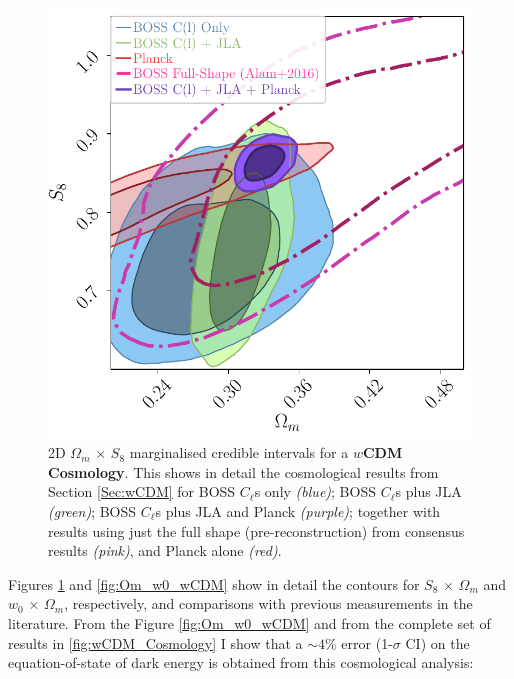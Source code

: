 \begin{figure}
\begin{center}
\includegraphics[scale=0.70]{BOSS-FIGS/Om_S8_wCDM.pdf}
\caption[2D $\Omega_m \, \times \, S_8$ marginalised credible intervals for a $w$CDM Cosmology.]{2D $\Omega_m \, \times \, S_8$ marginalised credible intervals for a \textbf{$w$CDM Cosmology}. This shows in detail the cosmological results from Section \ref{Sec:wCDM} for BOSS $C_{\ell}$s only \textit{(blue)}; BOSS $C_{\ell}$s plus JLA \textit{(green)}; BOSS $C_{\ell}$s plus JLA and Planck \textit{(purple)}; together with results using just the full shape (pre-reconstruction) from \protect\cite{2016BOSSCosmology} consensus results \textit{(pink)}, and Planck alone \textit{(red)}.}
\label{fig:Om_S8_wCDM}
\end{center}
\end{figure}

\qquad Figures \ref{fig:Om_S8_wCDM} and \ref{fig:Om_w0_wCDM} show in detail the contours for $S_8 \, \times \, \Omega_m$ and $w_0 \, \times \, \Omega_m$, respectively, and comparisons with previous measurements in the literature. From the Figure \ref{fig:Om_w0_wCDM} and from the complete set of results in \ref{fig:wCDM_Cosmology} I show that a $\sim 4\%$ error (1-$\sigma$ CI) on the equation-of-state of dark energy is obtained from this cosmological analysis:

